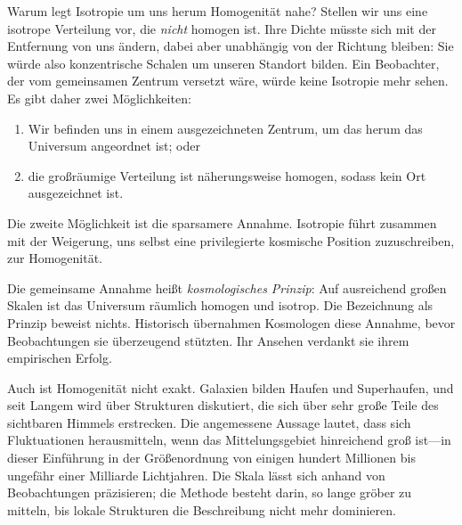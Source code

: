 Warum legt Isotropie um uns herum Homogenität nahe? Stellen wir uns eine isotrope Verteilung vor, die \emph{nicht} homogen ist. Ihre Dichte müsste sich mit der Entfernung von uns ändern, dabei aber unabhängig von der Richtung bleiben: Sie würde also konzentrische Schalen um unseren Standort bilden. Ein Beobachter, der vom gemeinsamen Zentrum versetzt wäre, würde keine Isotropie mehr sehen. Es gibt daher zwei Möglichkeiten:
\begin{enumerate}
\item Wir befinden uns in einem ausgezeichneten Zentrum, um das herum das Universum angeordnet ist; oder
\item die großräumige Verteilung ist näherungsweise homogen, sodass kein Ort ausgezeichnet ist.
\end{enumerate}
Die zweite Möglichkeit ist die sparsamere Annahme. Isotropie führt zusammen mit der Weigerung, uns selbst eine privilegierte kosmische Position zuzuschreiben, zur Homogenität.

\begin{classroomqa}
\end{classroomqa}

Die gemeinsame Annahme heißt \emph{kosmologisches Prinzip}: Auf ausreichend großen Skalen ist das Universum räumlich homogen und isotrop. Die Bezeichnung als Prinzip beweist nichts. Historisch übernahmen Kosmologen diese Annahme, bevor Beobachtungen sie überzeugend stützten. Ihr Ansehen verdankt sie ihrem empirischen Erfolg.

Auch ist Homogenität nicht exakt. Galaxien bilden Haufen und Superhaufen, und seit Langem wird über Strukturen diskutiert, die sich über sehr große Teile des sichtbaren Himmels erstrecken. Die angemessene Aussage lautet, dass sich Fluktuationen herausmitteln, wenn das Mittelungsgebiet hinreichend groß ist---in dieser Einführung in der Größenordnung von einigen hundert Millionen bis ungefähr einer Milliarde Lichtjahren. Die Skala lässt sich anhand von Beobachtungen präzisieren; die Methode besteht darin, so lange gröber zu mitteln, bis lokale Strukturen die Beschreibung nicht mehr dominieren.

